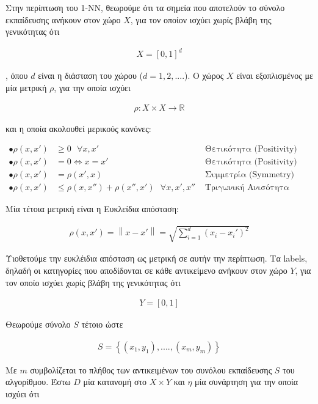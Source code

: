 \documentclass[12pt]{article}
\newcommand{\R}{\mathbb{R}}
\newcommand{\norm}[1]{\left\lVert#1\right\rVert}
\begin{document}
Στην περίπτωση του 1-ΝΝ, θεωρούμε ότι τα σημεία που αποτελούν το σύνολο εκπαίδευσης ανήκουν στον χώρο \(X\), για τον οποίον ισχύει χωρίς βλάβη της γενικότητας ότι

\begin{align*}
	X = [0,1]^d
\end{align*}

, όπου \(d\) είναι η διάσταση του χώρου (\(d = 1, 2, ....\)). Ο χώρος \(X\) είναι εξοπλισμένος με μία μετρική \(ρ\), για την οποία ισχύει

\begin{align*}
	ρ:X \times X \rightarrow \R
\end{align*}

και η οποία  ακολουθεί μερικούς κανόνες:

\begin{align*}
	\bullet ρ(x,x') &\geq 0 \text{ } \forall x,x' &\text{ Θετικότητα (Positivity)} \\
	\bullet ρ(x,x') &= 0 \Leftrightarrow x = x' &\text{ Θετικότητα (Positivity)} \\
	\bullet ρ(x,x') &= ρ(x',x) &\text{ Συμμετρία (Symmetry)}\\
	\bullet ρ(x,x') &\leq ρ(x,x'') + ρ(x'',x')  \text{ } \forall x,x',x'' &\text{ Τριγωνική Ανισότητα (Triangle Inequality)}
\end{align*}

Μία τέτοια μετρική είναι η Ευκλείδια απόσταση:

\begin{align*}
	ρ(x,x') = \norm{x- x'} =\sqrt{\sum_{i=1}^{d}(x_i - x_{i}')^2}
\end{align*}

Υιοθετούμε την ευκλέιδια απόσταση ως μετρική σε αυτήν την περίπτωση. Τα labels, δηλαδή οι κατηγορίες που αποδίδονται σε κάθε αντικείμενο ανήκουν στον χώρο \(Y\), για τον οποίο ισχύει χωρίς βλάβη της γενικότητας ότι

\begin{align*}
	Y = [0,1]
\end{align*}


Θεωρούμε σύνολο \(S\) τέτοιο ώστε

\begin{align*}
	S = \left\{(x_1, y_1), ...., (x_m, y_m)\right\}
\end{align*}

Με \(m\) συμβολίζεται το πλήθος των αντικειμένων του συνόλου εκπαίδευσης \(S\) του αλγορίθμου. Έστω \(D\) μία κατανομή στο \(X \times Y\) και \(η\) μία συνάρτηση για την οποία ισχύει ότι
\end{document}
